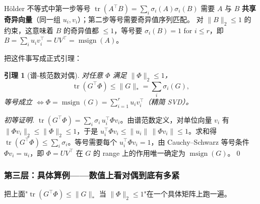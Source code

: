 \documentclass[11pt,a4paper]{article}
\theoremstyle{mythm}
\newtheorem{lemma}[theorem]{引理}
\theoremstyle{mydef}
\newcommand{\tr}{\operatorname{tr}}
\newcommand{\msign}{\operatorname{msign}}
\newcommand{\nuc}{\ast}
\begin{document}
Hölder 不等式中第一步等号 $\tr(A^\top B) = \sum_i \sigma_i(A)\sigma_i(B)$ 需要 $A$ 与 $B$ \textbf{共享奇异向量}（同一组 $u_i, v_i$）；第二步等号需要奇异值序列匹配。
对 $\|B\|_2 \le 1$ 的约束，这意味着 $B$ 的奇异值都 $\le 1$，等号要 $\sigma_i(B) = 1$ for $i \le r$，即 $B = \sum_i u_i v_i^\top = UV^\top = \msign(A)$。

把这件事写成正式引理：

\begin{lemma}[谱-核范数对偶]\label{lem:spec-nuc}
对任意 $\Phi$ 满足 $\|\Phi\|_2 \le 1$，
$$\tr(G^\top \Phi) \le \|G\|_\nuc = \sum_i \sigma_i(G),$$
等号成立 $\iff \Phi = \msign(G) = \sum_{i=1}^r u_i v_i^\top$（精简 SVD）。
\end{lemma}

\begin{proof}[初等证明]
$\tr(G^\top \Phi) = \sum_i \sigma_i\,u_i^\top \Phi v_i$。由谱范数定义，对单位向量 $v_i$ 有 $\|\Phi v_i\|_2 \le \|\Phi\|_2 \le 1$，于是 $u_i^\top \Phi v_i \le \|u_i\|\,\|\Phi v_i\| \le 1$。求和得 $\tr(G^\top \Phi) \le \sum_i \sigma_i$。等号需要每个 $u_i^\top\Phi v_i = 1$，由 Cauchy--Schwarz 等号条件 $\Phi v_i = u_i$，即 $\Phi = UV^\top$ 在 $G$ 的 range 上的作用唯一确定为 $\msign(G)$。\qed
\end{proof}

\subsubsection*{第三层：具体算例——数值上看对偶到底有多紧}

把上面"$\tr(G^\top \Phi) \le \|G\|_*$ 当 $\|\Phi\|_2 \le 1$"在一个具体矩阵上跑一遍。
\end{document}
